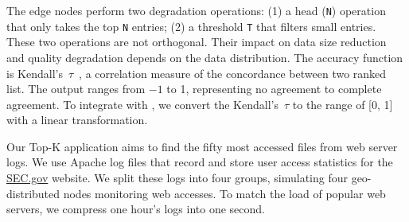 The edge nodes perform two degradation operations: (1) a head (\texttt{N})
operation that only takes the top \texttt{N} entries; (2) a threshold \texttt{T}
that filters small entries. These two operations are not orthogonal. Their impact on data size reduction and quality degradation depends on
the data distribution. The accuracy function is
Kendall's~$\tau$~\cite{abdi2007kendall}, a correlation measure of the
concordance between two ranked list. The output ranges from \(-1\) to 1,
representing no agreement to complete agreement. To integrate with \sysname{},
we convert the Kendall's~$\tau$ to the range of [0, 1] with a linear transformation.

Our Top-K application aims to find the fifty most accessed files from web server
logs. We use Apache log files that record and store user access statistics for
the \href{https://www.sec.gov}{SEC.gov} website. We split these logs into four
groups, simulating four geo-distributed nodes monitoring web accesses.
To match the load of popular web servers, we compress one hour's logs into one second.

